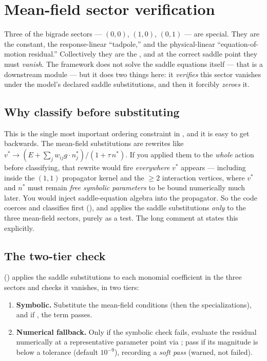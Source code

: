 \section{Mean-field sector verification}\label{sec:mf}

Three of the bigrade sectors --- $(0,0)$, $(1,0)$, $(0,1)$ --- are special. They are
the constant, the response-linear ``tadpole,'' and the physical-linear
``equation-of-motion residual.'' Collectively they are the , and at the correct saddle point they must \emph{vanish}. The framework does
not solve the saddle equations itself --- that is a downstream module --- but it does
two things here: it \emph{verifies} this sector vanishes under the model's declared
saddle substitutions, and then it forcibly \emph{zeroes} it.

\subsection{Why classify before substituting}

This is the single most important ordering constraint in , and it is
easy to get backwards. The mean-field substitutions are rewrites like
$v^{*}\to (E+\sum_j w_{ij}g\cdot n^{*}_j)/(1+\tau\,n^{*})$. If you applied them to the
\emph{whole} action before classifying, that rewrite would fire \emph{everywhere}
$v^{*}$ appears --- including inside the $(1,1)$ propagator kernel and the $\ge 2$
interaction vertices, where $v^{*}$ and $n^{*}$ must remain \emph{free symbolic
parameters} to be bound numerically much later. You would inject saddle-equation
algebra into the propagator. So the code coerces and classifies first
(), and applies the saddle substitutions \emph{only}
to the three mean-field sectors, purely as a test. The long comment at
 states this explicitly.

\subsection{The two-tier check}

 () applies the
saddle substitutions to each monomial coefficient in the three sectors and checks it
vanishes, in two tiers:

\begin{enumerate}
  \item \textbf{Symbolic.} Substitute the mean-field conditions (then the
        specializations), and if , the term passes.
  \item \textbf{Numerical fallback.} Only if the symbolic check fails, evaluate the
        residual numerically at a representative parameter point via
        ; pass if its magnitude is below a tolerance
        (default $10^{-9}$), recording a \emph{soft pass} (warned, not failed).
\end{enumerate}

